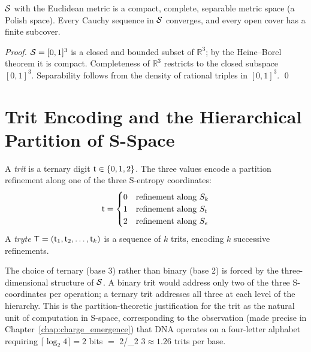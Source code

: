\begin{proposition}
\label{prop:sentropy_compact}
$\mathcal{S}$ with the Euclidean metric is a compact, complete, separable metric
space (a Polish space). Every Cauchy sequence in $\mathcal{S}$ converges, and every
open cover has a finite subcover.
\end{proposition}

\begin{proof}
$\mathcal{S} = [0,1]^3$ is a closed and bounded subset of $\mathbb{R}^3$; by the
Heine--Borel theorem it is compact. Completeness of $\mathbb{R}^3$ restricts
to the closed subspace $[0,1]^3$. Separability follows from the density of
rational triples in $[0,1]^3$. \qed
\end{proof}

\section{Trit Encoding and the Hierarchical Partition of S-Space}
\label{sec:trit_encoding}

\begin{definition}[Trit]
\label{def:trit}
A \emph{trit} is a ternary digit $\mathsf{t} \in \{0, 1, 2\}$. The three values
encode a partition refinement along one of the three S-entropy coordinates:
\begin{equation}
  \mathsf{t} = \begin{cases}
    0 & \text{refinement along } S_k \\
    1 & \text{refinement along } S_t \\
    2 & \text{refinement along } S_e
  \end{cases}
  \label{eq:trit_meaning}
\end{equation}
A \emph{tryte} $\mathsf{T} = (\mathsf{t}_1, \mathsf{t}_2, \ldots, \mathsf{t}_k)$ is a sequence
of $k$ trits, encoding $k$ successive refinements.
\end{definition}

\begin{remark}
The choice of ternary (base 3) rather than binary (base 2) is forced by the
three-dimensional structure of $\mathcal{S}$. A binary trit would address only
two of the three S-coordinates per operation; a ternary trit addresses all
three at each level of the hierarchy. This is the partition-theoretic
justification for the trit as the natural unit of computation in S-space,
corresponding to the observation (made precise in
Chapter~\ref{chap:charge_emergence}) that DNA operates on a four-letter
alphabet requiring $\lceil \log_2 4 \rceil = 2$ bits $= $ 2/\log_2 3$\approx 1.26$ trits
per base.
\end{remark}

